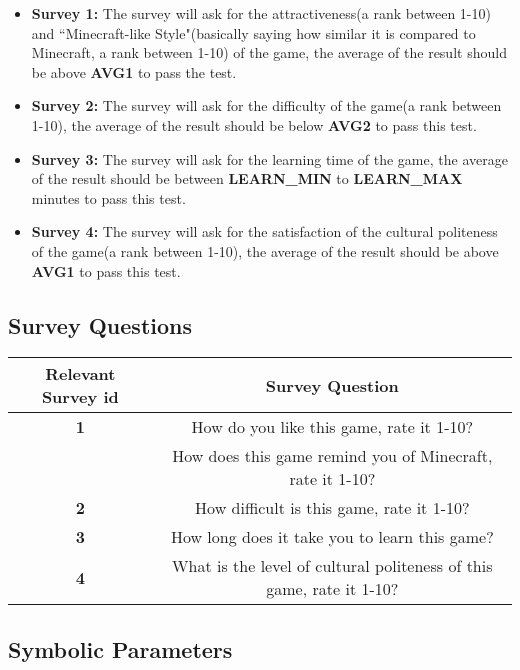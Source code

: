 \documentclass[12pt, titlepage]{article}
\begin{document}
\begin{itemize}
        \item \textbf{Survey 1:}\label{s1} The survey will ask for the attractiveness(a rank between 1-10) and ``Minecraft-like Style"(basically saying how similar it is compared to Minecraft, a rank between 1-10) of the game, the average of the result should be above \textbf{AVG1} to pass the test.
        \item \textbf{Survey 2:}\label{s2} The survey will ask for the difficulty of the game(a rank between 1-10), the average of the result should be below \textbf{AVG2} to pass this test.
        \item \textbf{Survey 3:}\label{s3} The survey will ask for the learning time of the game, the average of the result should be between \textbf{LEARN\_MIN} to \textbf{LEARN\_MAX} minutes to pass this test.
        \item \textbf{Survey 4:}\label{s4}  The survey will ask for the satisfaction of the cultural politeness of the game(a rank between 1-10), the average of the result should be above \textbf{AVG1} to pass this test.
\end{itemize}

\subsection{Survey Questions}

\begin{center}
\begin{tabular}{ |c|c| }
 \hline
 \textbf{Relevant Survey id} & \textbf{Survey Question}  \\
 \hline
 \textbf{1} & How do you like this game, rate it 1-10?  \\
     & How does this game remind you of Minecraft, rate it 1-10?  \\
 \hline
  \textbf{2} & How difficult is this game, rate it 1-10?  \\
 \hline
   \textbf{3} & How long does it take you to learn this game?  \\
 \hline
    \textbf{4} & What is the level of cultural politeness of this game, rate it 1-10?  \\
 \hline
\end{tabular}
\end{center}
\subsection{Symbolic Parameters}
\end{document}
